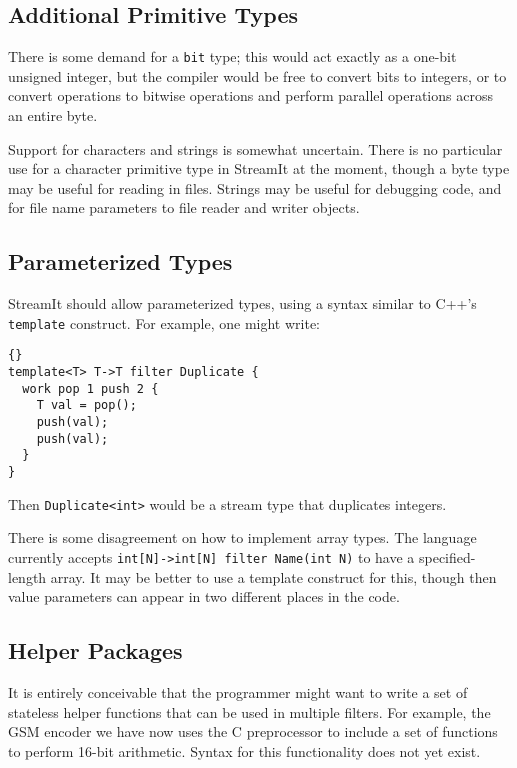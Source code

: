 \documentclass[11pt]{article}
\begin{document}
\subsection{Additional Primitive Types}

There is some demand for a \lstinline|bit| type; this would act exactly
as a one-bit unsigned integer, but the compiler would be free to
convert bits to integers, or to convert operations to bitwise
operations and perform parallel operations across an entire byte.

Support for characters and strings is somewhat uncertain.  There is no
particular use for a character primitive type in StreamIt at the
moment, though a byte type may be useful for reading in files.
Strings may be useful for debugging code, and for file name parameters
to file reader and writer objects.

\subsection{Parameterized Types}

StreamIt should allow parameterized types, using a syntax similar to
C++'s \lstinline|template| construct.  For example, one might write:

\begin{lstlisting}{}
template<T> T->T filter Duplicate {
  work pop 1 push 2 {
    T val = pop();
    push(val);
    push(val);
  }
}
\end{lstlisting}

Then \lstinline|Duplicate<int>| would be a stream type that duplicates
integers.

There is some disagreement on how to implement array types.  The
language currently accepts \lstinline|int[N]->int[N] filter Name(int N)| to
have a specified-length array.  It may be better to use a template
construct for this, though then value parameters can appear in two
different places in the code.

\subsection{Helper Packages}

It is entirely conceivable that the programmer might want to write a
set of stateless helper functions that can be used in multiple
filters.  For example, the GSM encoder we have now uses the C
preprocessor to include a set of functions to perform 16-bit
arithmetic.  Syntax for this functionality does not yet exist.
\end{document}
